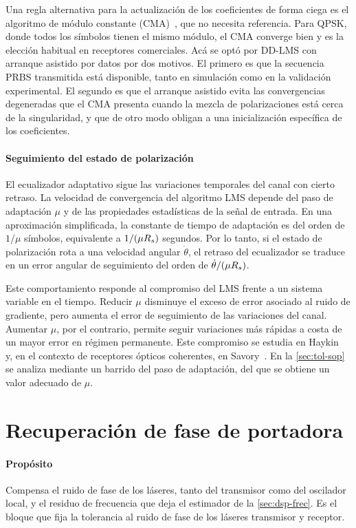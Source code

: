 Una regla alternativa para la actualizaci\'on de los coeficientes de forma
ciega es el algoritmo de m\'odulo constante
(CMA)~\cite[sec.~5.2.2]{mello2021}, que no necesita referencia. Para QPSK,
donde todos los s\'imbolos tienen el mismo m\'odulo, el CMA converge bien y es
la elecci\'on habitual en receptores comerciales. Ac\'a se opt\'o por DD-LMS
con arranque asistido por datos por dos motivos. El primero es que la
secuencia PRBS transmitida est\'a disponible, tanto en simulaci\'on como en la
validaci\'on experimental. El segundo es que el arranque asistido evita las
convergencias degeneradas que el CMA presenta cuando la mezcla de
polarizaciones est\'a cerca de la singularidad, y que de otro modo obligan a
una inicializaci\'on espec\'ifica de los coeficientes.

\paragraph{Seguimiento del estado de polarizaci\'on}
El ecualizador adaptativo sigue las variaciones temporales del canal con
cierto retraso. La velocidad de convergencia del algoritmo LMS depende del
paso de adaptaci\'on $\mu$ y de las propiedades estad\'isticas de la se\~nal
de entrada. En una aproximaci\'on simplificada, la constante de tiempo de
adaptaci\'on es del orden de $1/\mu$ s\'imbolos, equivalente a $1/(\mu R_{s})$
segundos. Por lo tanto, si el estado de polarizaci\'on rota a una velocidad
angular $\dot\theta$, el retraso del ecualizador se traduce en un error
angular de seguimiento del orden de $\dot\theta/(\mu R_{s})$.

Este comportamiento responde al compromiso del LMS frente a un sistema
variable en el tiempo. Reducir $\mu$ disminuye el exceso de error asociado al
ruido de gradiente, pero aumenta el error de seguimiento de las variaciones
del canal. Aumentar $\mu$, por el contrario, permite seguir variaciones m\'as
r\'apidas a costa de un mayor error en r\'egimen permanente. Este compromiso
se estudia en Haykin~\cite{haykin2014} y, en el contexto de receptores
\'opticos coherentes, en Savory~\cite{savory2010}. En la \cref{sec:tol-sop} se
analiza mediante un barrido del paso de adaptaci\'on, del que se obtiene un
valor adecuado de $\mu$.


\section{Recuperaci\'on de fase de portadora}
\label{sec:dsp-cpr}

\paragraph{Prop\'osito}
Compensa el ruido de fase de los l\'aseres, tanto del transmisor como del
oscilador local, y el residuo de frecuencia que deja el estimador de la
\cref{sec:dsp-frec}. Es el bloque que fija la tolerancia al ruido de fase de los l\'aseres transmisor
y receptor.

